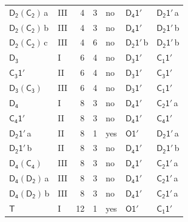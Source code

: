 \documentclass[10pt,a4paper]{article}
\numberwithin{equation}{section}
\newcommand{\grp}[1]{\mathsf{#1}}
\newcommand{\clsletter}[1]{\,{\scriptsize\color{black!55}#1}}
\begin{document}
{\begin{longtable}{@{}llrrlll@{}}
\href{D2-C2.pdf}{$\grp{D_{2}}(\grp{C_{2}})$}\clsletter{a} & III & 4 & 3 & no & \href{D4-1p.pdf}{$\grp{D_{4}1'}$} & \href{D2-1p.pdf}{$\grp{D_{2}1'}$}\clsletter{a}\\
\href{D2-C2.pdf}{$\grp{D_{2}}(\grp{C_{2}})$}\clsletter{b} & III & 4 & 3 & no & \href{D4-1p.pdf}{$\grp{D_{4}1'}$} & \href{D2-1p.pdf}{$\grp{D_{2}1'}$}\clsletter{b}\\
\href{D2-C2.pdf}{$\grp{D_{2}}(\grp{C_{2}})$}\clsletter{c} & III & 4 & 6 & no & \href{D2-1p.pdf}{$\grp{D_{2}1'}$}\clsletter{b} & \href{D2-1p.pdf}{$\grp{D_{2}1'}$}\clsletter{b}\\
\href{../../../rotation/data/pdf/D3.pdf}{$\grp{D_{3}}$} & I & 6 & 4 & no & \href{D3-1p.pdf}{$\grp{D_{3}1'}$} & \href{C1-1p.pdf}{$\grp{C_{1}1'}$}\\
\href{C3-1p.pdf}{$\grp{C_{3}1'}$} & II & 6 & 4 & no & \href{D3-1p.pdf}{$\grp{D_{3}1'}$} & \href{C3-1p.pdf}{$\grp{C_{3}1'}$}\\
\href{D3-C3.pdf}{$\grp{D_{3}}(\grp{C_{3}})$} & III & 6 & 4 & no & \href{D3-1p.pdf}{$\grp{D_{3}1'}$} & \href{C1-1p.pdf}{$\grp{C_{1}1'}$}\\
\href{../../../rotation/data/pdf/D4.pdf}{$\grp{D_{4}}$} & I & 8 & 3 & no & \href{D4-1p.pdf}{$\grp{D_{4}1'}$} & \href{C2-1p.pdf}{$\grp{C_{2}1'}$}\clsletter{a}\\
\href{C4-1p.pdf}{$\grp{C_{4}1'}$} & II & 8 & 3 & no & \href{D4-1p.pdf}{$\grp{D_{4}1'}$} & \href{C4-1p.pdf}{$\grp{C_{4}1'}$}\\
\href{D2-1p.pdf}{$\grp{D_{2}1'}$}\clsletter{a} & II & 8 & 1 & yes & \href{O-1p.pdf}{$\grp{O1'}$} & \href{D2-1p.pdf}{$\grp{D_{2}1'}$}\clsletter{a}\\
\href{D2-1p.pdf}{$\grp{D_{2}1'}$}\clsletter{b} & II & 8 & 3 & no & \href{D4-1p.pdf}{$\grp{D_{4}1'}$} & \href{D2-1p.pdf}{$\grp{D_{2}1'}$}\clsletter{b}\\
\href{D4-C4.pdf}{$\grp{D_{4}}(\grp{C_{4}})$} & III & 8 & 3 & no & \href{D4-1p.pdf}{$\grp{D_{4}1'}$} & \href{C2-1p.pdf}{$\grp{C_{2}1'}$}\clsletter{a}\\
\href{D4-D2.pdf}{$\grp{D_{4}}(\grp{D_{2}})$}\clsletter{a} & III & 8 & 3 & no & \href{D4-1p.pdf}{$\grp{D_{4}1'}$} & \href{C2-1p.pdf}{$\grp{C_{2}1'}$}\clsletter{a}\\
\href{D4-D2.pdf}{$\grp{D_{4}}(\grp{D_{2}})$}\clsletter{b} & III & 8 & 3 & no & \href{D4-1p.pdf}{$\grp{D_{4}1'}$} & \href{C2-1p.pdf}{$\grp{C_{2}1'}$}\clsletter{a}\\
\href{../../../rotation/data/pdf/T.pdf}{$\grp{T}$} & I & 12 & 1 & yes & \href{O-1p.pdf}{$\grp{O1'}$} & \href{C1-1p.pdf}{$\grp{C_{1}1'}$}\\

\end{longtable}}
\end{document}
